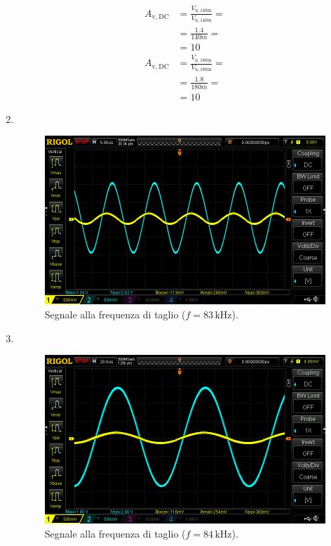 \documentclass[a4paper]{article}
\begin{document}
\begin{enumerate}[label=\alph*.]
\begin{equation*}
						\begin{split}
							A_{\mathrm{v, DC}} &= \frac{V_{\mathrm{u, 140m}}}{V_{\mathrm{u, 140m}}} = \\
											   &= \frac{1.4}{140m} = \\
											   &= 10
						\end{split}
					\end{equation*}
					\begin{equation*}
						\begin{split}
							A_{\mathrm{v, DC}} &= \frac{V_{\mathrm{u, 180m}}}{V_{\mathrm{u, 180m}}} = \\
											   &= \frac{1.8}{180m} = \\
											   &= 10
						\end{split}
					\end{equation*}
				\item \ 
					\newline
					\begin{figure}[h!]
						\centering
						\includegraphics[scale=0.4]{frequenzaDiTaglioC4}
						\caption{Segnale alla frequenza di taglio ($ f = 83 \, \mathrm{kHz} $).}
						\label{fig:frequenzaDiTaglioC4}
					\end{figure}
				\item \ 
					\newline
					\newpage
					\begin{figure}[h!]
						\centering
						\includegraphics[scale=0.4]{frequenzaDiTaglioC5}
						\caption{Segnale alla frequenza di taglio ($ f = 84 \, \mathrm{kHz} $).}
						\label{fig:frequenzaDiTaglioC5}
					\end{figure}
			\end{enumerate}
\end{document}
